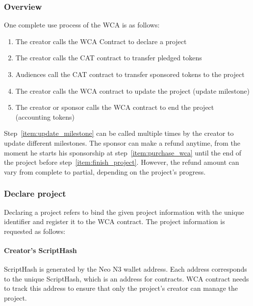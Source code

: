 \documentclass[12pt,a4paper]{article}
\begin{document}
    \subsubsection{Overview}

    One complete use process of the WCA is as follows:

    \begin{enumerate}
        \item The creator calls the WCA Contract to declare a project
        \item The creator calls the CAT contract to transfer pledged tokens
        \item Audiences call the CAT contract to transfer sponsored tokens to the
        project\label{item:purchase_wca}
        \item The creator calls the WCA contract to update the project (update
        milestone)\label{item:update_milestone}
        \item The creator or sponsor calls the WCA contract to end the project
        (accounting tokens)\label{item:finish_project}
    \end{enumerate}

    Step~\ref{item:update_milestone} can be called multiple times by the creator
    to update different milestones.
    The sponsor can make a refund anytime, from the moment he starts his sponsorship
    at step~\ref{item:purchase_wca} until the end of the project before
    step~\ref{item:finish_project}.
    However, the refund amount can vary from complete to partial, depending on
    the project's progress.

    \subsubsection{Declare project}

    Declaring a project refers to bind the given project information with the
    unique identifier and register it to the WCA contract.
    The project information is requested as follows:

    \paragraph{Creator's ScriptHash}

    ScriptHash is generated by the Neo N3 wallet address.
    Each address corresponds to the unique ScriptHash, which is an address for
    contracts.
    WCA contract needs to track this address to ensure that only the project's
    creator can manage the project.
\end{document}
